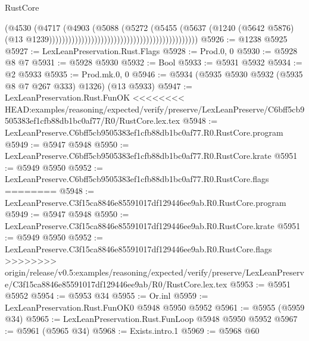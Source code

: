 \begin{lexlean}{RustCore}
\begin{coremodule}
{\begin{coremodule}
{{{{{{{{{{{{{{{{{{{{{{{{{{{{{{{{{{{{{{{{{{{{{                                                                              (@4530
                                                                                (@4717
                                                                                  (@4903
                                                                                    (@5088
                                                                                      (@5272
                                                                                        (@5455
                                                                                          (@5637
                                                                                            (@1240
                                                                                              (@5642
                                                                                                @5876)
                                                                                              (@13
                                                                                                @1239))))))))))))))))))))))))))))))))))))))))))))))
@5926 := @1238 @5925
@5927 := LexLeanPreservation.Rust.Flags
@5928 := Prod.{0, 0}
@5930 := @5928 @8 @7
@5931 := @5928 @5930
@5932 := Bool
@5933 := @5931 @5932
@5934 := @2 @5933
@5935 := Prod.mk.{0, 0}
@5946 := @5934 (@5935 @5930 @5932 (@5935 @8 @7 @267 @333) @1326) (@13 @5933)
@5947 := LexLeanPreservation.Rust.FunOK
<<<<<<<< HEAD:examples/reasoning/expected/verify/preserve/LexLeanPreserve/C6bff5cb9505383ef1cfb88db1bc0af77/R0/RustCore.lex.tex
@5948 := LexLeanPreserve.C6bff5cb9505383ef1cfb88db1bc0af77.R0.RustCore.program
@5949 := @5947 @5948
@5950 := LexLeanPreserve.C6bff5cb9505383ef1cfb88db1bc0af77.R0.RustCore.krate
@5951 := @5949 @5950
@5952 := LexLeanPreserve.C6bff5cb9505383ef1cfb88db1bc0af77.R0.RustCore.flags
========
@5948 := LexLeanPreserve.C3f15ca8846e85591017df129446ee9ab.R0.RustCore.program
@5949 := @5947 @5948
@5950 := LexLeanPreserve.C3f15ca8846e85591017df129446ee9ab.R0.RustCore.krate
@5951 := @5949 @5950
@5952 := LexLeanPreserve.C3f15ca8846e85591017df129446ee9ab.R0.RustCore.flags
>>>>>>>> origin/release/v0.5:examples/reasoning/expected/verify/preserve/LexLeanPreserve/C3f15ca8846e85591017df129446ee9ab/R0/RustCore.lex.tex
@5953 := @5951 @5952
@5954 := @5953 @34
@5955 := Or.inl
@5959 := LexLeanPreservation.Rust.FunOK0 @5948 @5950 @5952
@5961 := @5955 (@5959 @34)
@5965 := LexLeanPreservation.Rust.FunLoop @5948 @5950 @5952
@5967 := @5961 (@5965 @34)
@5968 := Exists.intro.{1}
@5969 := @5968 @60
}}}}}}}}}}}}}}}}}}}}}}}}}}}}}}}}}}}}}}}}}}}}}
\end{coremodule}}
\end{coremodule}
\end{lexlean}
